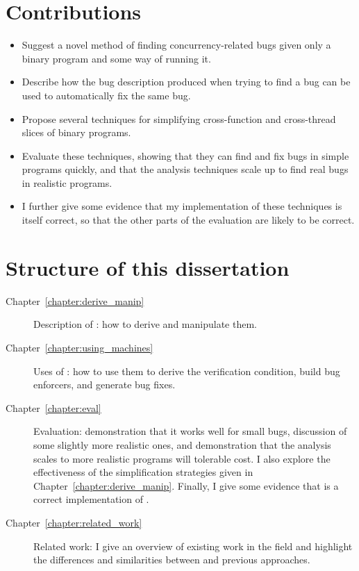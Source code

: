 
\section{Contributions}

\begin{itemize}
\item
  Suggest a novel method of finding concurrency-related bugs given
  only a binary program and some way of running it.
\item
  Describe how the bug description produced when trying to find a bug
  can be used to automatically fix the same bug.
\item
  Propose several techniques for simplifying cross-function and
  cross-thread slices of binary programs.
\item
  Evaluate these techniques, showing that they can find and fix bugs
  in simple programs quickly, and that the analysis techniques
   scale up to find real bugs in realistic
  programs.
\item
  I further give some evidence that my implementation of these
  techniques is itself correct, so that the other parts of the
  evaluation are likely to be correct.
\end{itemize}


\section{Structure of this dissertation}

\begin{description}
\item[Chapter~\ref{chapter:derive_manip}] Description of
  \StateMachines: how to derive and manipulate them.
\item[Chapter~\ref{chapter:using_machines}] Uses of \StateMachines:
  how to use them to derive the verification condition, build bug
  enforcers, and generate bug fixes.
\item[Chapter~\ref{chapter:eval}] Evaluation: demonstration that it
  works well for small bugs, discussion of some slightly more
  realistic ones, and demonstration that the analysis scales to more
  realistic programs will tolerable cost.  I also explore the
  effectiveness of the {\StateMachine} simplification strategies given
  in Chapter~\ref{chapter:derive_manip}.  Finally, I give some
  evidence that {\implementation} is a correct implementation of
  {\technique}.
\item[Chapter~\ref{chapter:related_work}] Related work: I give an
  overview of existing work in the field and highlight the differences
  and similarities between {\technique} and previous approaches.
\end{description}

